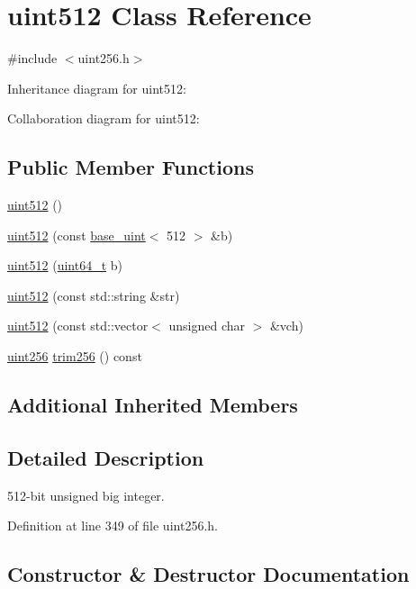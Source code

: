 \hypertarget{classuint512}{}\section{uint512 Class Reference}
\label{classuint512}


{\ttfamily \#include $<$uint256.\+h$>$}



Inheritance diagram for uint512\+:


Collaboration diagram for uint512\+:
\subsection*{Public Member Functions}
\begin{DoxyCompactItemize}
\item 
\hyperlink{classuint512_afc3f70aa77709d87371f7a018e5410be}{uint512} ()
\item 
\hyperlink{classuint512_a7650e39f0ddd7401d6f9edb70cc30715}{uint512} (const \hyperlink{classbase__uint}{base\+\_\+uint}$<$ 512 $>$ \&b)
\item 
\hyperlink{classuint512_a9b0342e991f4a3f858c9744a671b83d2}{uint512} (\hyperlink{stdint_8h_aaa5d1cd013383c889537491c3cfd9aad}{uint64\+\_\+t} b)
\item 
\hyperlink{classuint512_a407d2a7a59005a57e848327014c7d2b5}{uint512} (const std\+::string \&str)
\item 
\hyperlink{classuint512_a017c6e9933a94a0d9b2eb2fff280065a}{uint512} (const std\+::vector$<$ unsigned char $>$ \&vch)
\item 
\hyperlink{classuint256}{uint256} \hyperlink{classuint512_adbe0526a9ef6eedc10a530834b4ab89a}{trim256} () const 
\end{DoxyCompactItemize}
\subsection*{Additional Inherited Members}


\subsection{Detailed Description}
512-\/bit unsigned big integer. 

Definition at line 349 of file uint256.\+h.



\subsection{Constructor \& Destructor Documentation}
\hypertarget{classuint512_afc3f70aa77709d87371f7a018e5410be}{}
